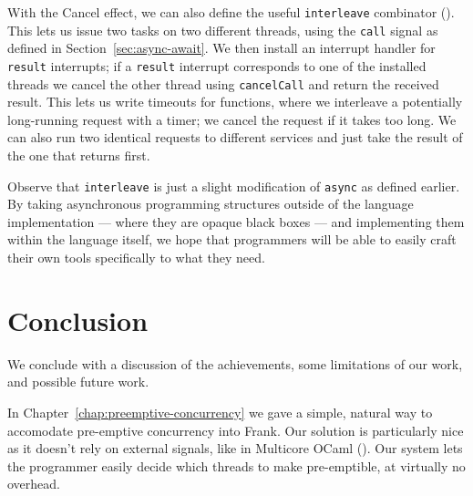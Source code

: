 \documentclass[msc,deptreport,cs]{infthesis} %
\newcommand{\code}[1]{\lstinline{#1}}
\begin{document}
With the \textsf{Cancel} effect, we can also define the useful \code{interleave}
combinator (\cite{leijen2017structured}).
%
This lets us issue two tasks on two different threads, using the \code{call}
signal as defined in Section~\ref{sec:async-await}. We then install an interrupt
handler for \code{result} interrupts; if a \code{result} interrupt corresponds
to one of the installed threads we cancel the other thread using
\code{cancelCall} and return the received result. This lets us write timeouts
for functions, where we interleave a potentially long-running request with a
timer; we cancel the request if it takes too long. We can also run two identical
requests to different services and just take the result of the one that returns
first.


Observe that \code{interleave} is just a slight modification of \code{async} as
defined earlier. By taking asynchronous programming structures outside of the
language implementation --- where they are opaque black boxes --- and
implementing them within the language itself, we hope that programmers will be able to easily craft their own tools specifically to what they need.





\chapter{Conclusion}
\label{chap:conclusion}

We conclude with a discussion of the achievements, some limitations of our work, and
possible future work.

In Chapter~\ref{chap:preemptive-concurrency} we gave a simple, natural way to
accomodate pre-emptive concurrency into Frank. Our solution is particularly nice
as it doesn't rely on external signals, like in Multicore OCaml
(\cite{dolan2017concurrent}). Our system lets the programmer easily decide which threads to make pre-emptible, at virtually no overhead.
\end{document}
